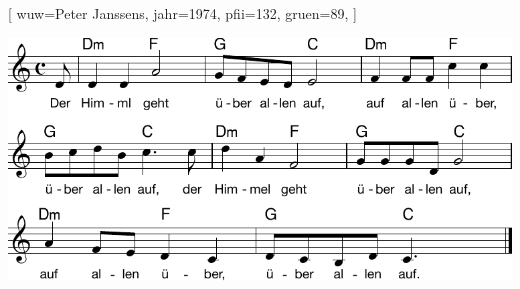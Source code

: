 [
    wuw={Peter Janssens}, 
    jahr={1974},
    pfii={132}, 
    gruen={89},
]

\beginverse
\endverse
\includegraphics[draft=false, width=1\textwidth]{Noten/Lied107a.pdf}

\endsong
